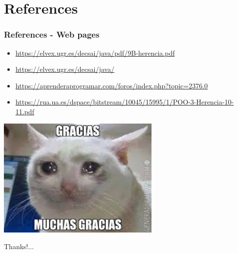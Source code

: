 \documentclass[11pt]{beamer}
\begin{document}
\section{References}
\begin{frame}
\frametitle{References - Web pages}
\begin{itemize}
\item \url{https://elvex.ugr.es/decsai/java/pdf/9B-herencia.pdf}
\item \url{https://elvex.ugr.es/decsai/java/}
\item \url{https://aprenderaprogramar.com/foros/index.php?topic=2376.0}
\item \url{https://rua.ua.es/dspace/bitstream/10045/15995/1/POO-3-Herencia-10-11.pdf}

\end{itemize}
\end{frame}

\begin{frame}
\begin{center}
{\includegraphics[width=8.0cm]{img/meme.jpeg}}
\end{center}
\begin{center}
Thanks!...
\
\end{center}
\end{frame}
\end{document}
